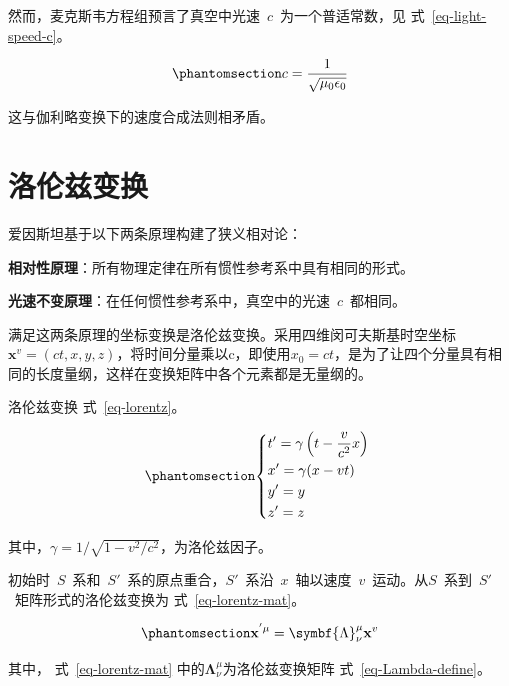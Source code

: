 \documentclass[
  chinese,
  a4paper,
  UTF8,
  12pt,
  oneside,
  openany]{ctexbook}
\begin{document}
然而，麦克斯韦方程组预言了真空中光速~\(c\)~为一个普适常数，见
式~\ref{eq-light-speed-c}。

\begin{equation}\protect\phantomsection\label{eq-light-speed-c}{
c = \frac{1}{\sqrt{\mu_{0}\epsilon_{0}}}
}\end{equation}

这与伽利略变换下的速度合成法则相矛盾。

\section{洛伦兹变换}\label{ux6d1bux4f26ux5179ux53d8ux6362}

爱因斯坦基于以下两条原理构建了狭义相对论：

\textbf{相对性原理}：所有物理定律在所有惯性参考系中具有相同的形式。

\textbf{光速不变原理}：在任何惯性参考系中，真空中的光速~\(c\)~都相同。

满足这两条原理的坐标变换是洛伦兹变换。采用四维闵可夫斯基时空坐标~\(\mathbf{x}^{v}=(ct,x,y,z)\)，将时间分量乘以c，即使用\(x_{0} = ct\)，是为了让四个分量具有相同的长度量纲，这样在变换矩阵中各个元素都是无量纲的。

洛伦兹变换 式~\ref{eq-lorentz}。

\begin{equation}\protect\phantomsection\label{eq-lorentz}{
\left\{ \begin{aligned}
   & t' = \gamma\left( t - \frac{v}{c^{2}}x \right) \\
   & x' = \gamma(x - vt) \\
   & y' = y \\
   & z' = z
  \end{aligned} \right.\
}\end{equation}

其中，\(\gamma = 1/\sqrt{1 - v^{2}/c^{2}}\)，为洛伦兹因子。

初始时~\(S\)~系和~\(S'\)~系的原点重合，\(S'\)~系沿~\(x\)~轴以速度~\(v\)~运动。从\(S\)~系到~\(S'\)~矩阵形式的洛伦兹变换为
式~\ref{eq-lorentz-mat}。

\begin{equation}\protect\phantomsection\label{eq-lorentz-mat}{
\mathbf{x}^{'\mu} = \symbf{\Lambda}_{\nu}^{\mu}\mathbf{x}^{v}
}\end{equation}

其中， 式~\ref{eq-lorentz-mat}
中的\(\symbf{\Lambda}_{\nu}^{\mu}\)为洛伦兹变换矩阵
式~\ref{eq-Lambda-define}。
\end{document}
